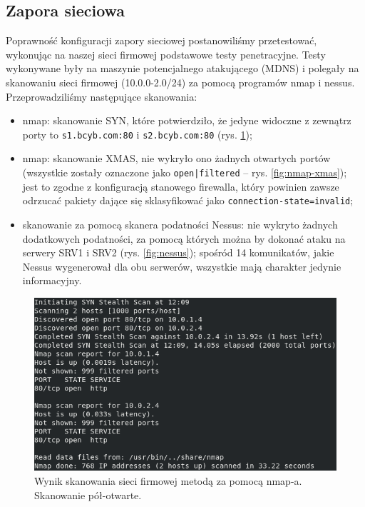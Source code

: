 \documentclass{eiti-raport}
\begin{document}
\subsection{Zapora sieciowa} \label{sec:testy-firewall}
Poprawność konfiguracji zapory sieciowej postanowiliśmy przetestować, wykonując na naszej sieci firmowej podstawowe testy penetracyjne. Testy wykonywane były na maszynie potencjalnego atakującego (MDNS) i polegały na skanowaniu sieci firmowej (10.0.0-2.0/24) za pomocą programów nmap i nessus. Przeprowadziliśmy następujące skanowania:
\begin{itemize}
	\item nmap: skanowanie SYN, które potwierdziło, że jedyne widoczne z zewnątrz porty to \texttt{s1.bcyb.com:80} i \texttt{s2.bcyb.com:80} (rys. \ref{fig:nmap});
	\item nmap: skanowanie XMAS, nie wykryło ono żadnych otwartych portów (wszystkie zostały oznaczone jako \texttt{open|filtered} -- rys. \ref{fig:nmap-xmas}); jest to zgodne z konfiguracją stanowego firewalla, który powinien zawsze odrzucać pakiety dające się sklasyfikować jako \texttt{connection-state=invalid}; 
	\item skanowanie za pomocą skanera podatności Nessus: nie wykryto żadnych dodatkowych podatności, za pomocą których można by dokonać ataku na serwery SRV1 i SRV2 (rys. \ref{fig:nessus}); spośród 14 komunikatów, jakie Nessus wygenerował dla obu serwerów, wszystkie mają charakter jedynie informacyjny. 
\end{itemize}

\begin{figure}[!h] \centering
	\includegraphics[width=0.95\linewidth]{img/nmap.PNG}
	\caption{Wynik skanowania sieci firmowej metodą za pomocą nmap-a. Skanowanie pół-otwarte.} \label{fig:nmap}
\end{figure}
\end{document}
